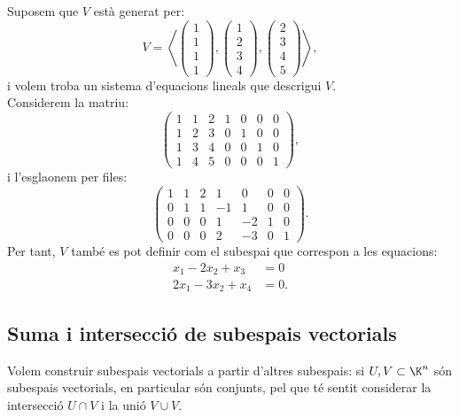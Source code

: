 \begin{exemple}
    Suposem que $V$ està generat per:
    $$
    V=\left\langle
    \begin{pmatrix}1 \\ 1 \\ 1 \\ 1  \end{pmatrix},
    \begin{pmatrix}1 \\ 2 \\ 3 \\ 4  \end{pmatrix},
    \begin{pmatrix}2 \\ 3 \\ 4 \\ 5  \end{pmatrix}\right\rangle,
    $$
    i volem troba un sistema d'equacions lineals que descrigui $V$.\\
    Considerem la matriu:
    $$
    \left(
    \begin{array}{ccc|cccc}
    1 & 1 & 2 & 1 & 0 & 0 & 0\\
    1 & 2 & 3 & 0 & 1 & 0 & 0\\
    1 & 3 & 4 & 0 & 0 & 1 & 0\\
    1 & 4 & 5 & 0 & 0 & 0 & 1
    \end{array}
    \right),
    $$
    i l'esglaonem per files:
    $$
    \left(
    \begin{array}{ccc|rrcc}
    1 & 1 & 2 & 1 & 0 & 0 & 0\\
    0 & 1 & 1 & -1 & 1 & 0 & 0\\ \hline
    0 & 0 & 0 & 1 & -2 & 1 & 0\\
    0 & 0 & 0 & 2 & -3 & 0 & 1
    \end{array}
    \right).
    $$
    Per tant, $V$ també es pot definir com el subespai que correspon a les equacions:
    \begin{align*}
    x_1-2x_2+x_3&=0\\ 2x_1-3x_2+x_4&=0.
    \end{align*}
    \end{exemple}

\subsection{Suma i intersecció de subespais vectorials}
Volem construir subespais vectorials a partir d'altres subespais: si $U,V\subset \K^n$ són subespais vectorials, en particular són conjunts, pel que té sentit considerar la intersecció $U\cap V$ i la unió $V\cup V$.

